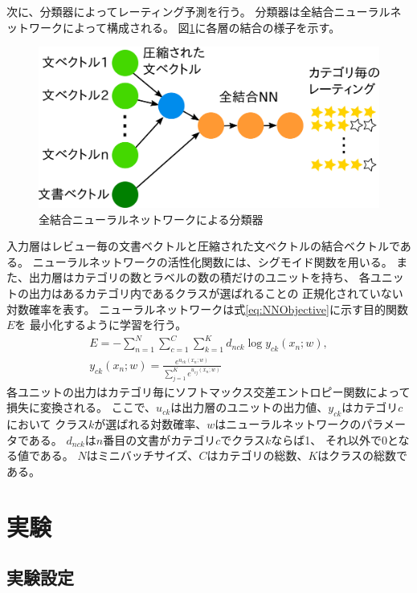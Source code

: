 \documentclass[twocolumn,a4paper]{ltjarticle}
\makeatletter
\let\tti@includegraphics\includegraphics
\renewcommand{\includegraphics}[1]{%
    \tti@includegraphics[width=\linewidth]{#1}}
\makeatother
\begin{document}
次に、分類器によってレーティング予測を行う。
分類器は全結合ニューラルネットワークによって構成される。
図\ref{fig:MyModel}に各層の結合の様子を示す。
\begin{figure}[t]
  \includegraphics{fig/model.png}
  \caption{全結合ニューラルネットワークによる分類器}
  \label{fig:MyModel}
\end{figure}
入力層はレビュー毎の文書ベクトルと圧縮された文ベクトルの結合ベクトルである。
ニューラルネットワークの活性化関数には、シグモイド関数を用いる。
また、出力層はカテゴリの数とラベルの数の積だけのユニットを持ち、
各ユニットの出力はあるカテゴリ内であるクラスが選ばれることの
正規化されていない対数確率を表す。
ニューラルネットワークは式\ref{eq:NNObjective}に示す目的関数$E$を
最小化するように学習を行う。
\begin{gather}
  E = - \sum^{N}_{n = 1} \sum^{C}_{c = 1} \sum^{K}_{k = 1}
        d_{nck} \log{y_{ck}(x_n; w)},
  \label{eq:NNObjective} \\
  y_{ck}(x_n; w) = \frac{e^{u_{ck}(x_n; w)}}
                        {\sum^{K}_{j = 1} e^{u_{cj}(x_n; w)}} \nonumber
\end{gather}
各ユニットの出力はカテゴリ毎にソフトマックス交差エントロピー関数によって
損失に変換される。
ここで、$u_{ck}$は出力層のユニットの出力値、$y_{ck}$はカテゴリ$c$において
クラス$k$が選ばれる対数確率、$w$はニューラルネットワークのパラメータである。
$d_{nck}$は$n$番目の文書がカテゴリ$c$でクラス$k$ならば1、
それ以外で0となる値である。
$N$はミニバッチサイズ、$C$はカテゴリの総数、$K$はクラスの総数である。


\section{実験}

\subsection{実験設定}
\end{document}
